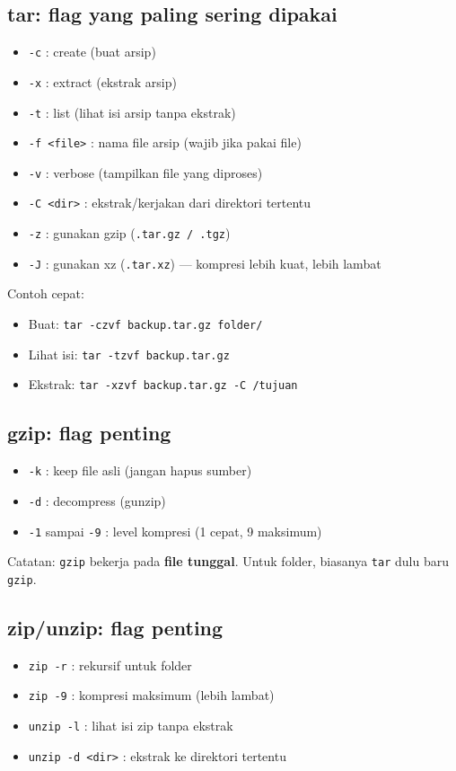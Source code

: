 \subsection*{tar: flag yang paling sering dipakai}
\begin{itemize}
    \item \texttt{-c} : create (buat arsip)
    \item \texttt{-x} : extract (ekstrak arsip)
    \item \texttt{-t} : list (lihat isi arsip tanpa ekstrak)
    \item \texttt{-f <file>} : nama file arsip (wajib jika pakai file)
    \item \texttt{-v} : verbose (tampilkan file yang diproses)
    \item \texttt{-C <dir>} : ekstrak/kerjakan dari direktori tertentu
    \item \texttt{-z} : gunakan gzip (\texttt{.tar.gz / .tgz})
    \item \texttt{-J} : gunakan xz (\texttt{.tar.xz}) — kompresi lebih kuat, lebih lambat
\end{itemize}

Contoh cepat:
\begin{itemize}
    \item Buat: \texttt{tar -czvf backup.tar.gz folder/}
    \item Lihat isi: \texttt{tar -tzvf backup.tar.gz}
    \item Ekstrak: \texttt{tar -xzvf backup.tar.gz -C /tujuan}
\end{itemize}

\subsection*{gzip: flag penting}
\begin{itemize}
    \item \texttt{-k} : keep file asli (jangan hapus sumber)
    \item \texttt{-d} : decompress (gunzip)
    \item \texttt{-1} sampai \texttt{-9} : level kompresi (1 cepat, 9 maksimum)
\end{itemize}
Catatan: \texttt{gzip} bekerja pada \textbf{file tunggal}. Untuk folder, biasanya \texttt{tar} dulu baru \texttt{gzip}.

\subsection*{zip/unzip: flag penting}
\begin{itemize}
    \item \texttt{zip -r} : rekursif untuk folder
    \item \texttt{zip -9} : kompresi maksimum (lebih lambat)
    \item \texttt{unzip -l} : lihat isi zip tanpa ekstrak
    \item \texttt{unzip -d <dir>} : ekstrak ke direktori tertentu
\end{itemize}

